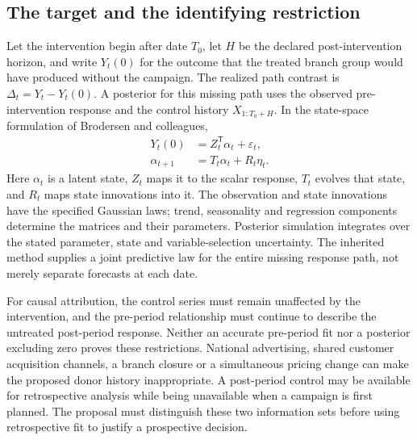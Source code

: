 \subsection{The target and the identifying restriction}

Let the intervention begin after date \(T_0\), let \(H\) be the declared
post-intervention horizon, and write \(Y_t(0)\) for the outcome that the
treated branch group would have produced without the campaign. The realized
path contrast is \(\Delta_t=Y_t-Y_t(0)\). A posterior for this missing path
uses the observed pre-intervention response and the control history
\(X_{1:T_0+H}\). In the state-space formulation of Brodersen and colleagues,
\begin{align}
 Y_t(0)&=Z_t^{\mathsf T}\alpha_t+\varepsilon_t,\\
 \alpha_{t+1}&=T_t\alpha_t+R_t\eta_t.
\end{align}
Here \(\alpha_t\) is a latent state, \(Z_t\) maps it to the scalar response,
\(T_t\) evolves that state, and \(R_t\) maps state innovations into it.
The observation and state innovations have the specified Gaussian laws;
trend, seasonality and regression components determine the matrices and
their parameters. Posterior simulation integrates over the stated parameter,
state and variable-selection uncertainty. The inherited method supplies a
joint predictive law for the entire missing response path, not merely
separate forecasts at each date. \citep{exec13_ci_brodersen2015}

For causal attribution, the control series must remain unaffected by the
intervention, and the pre-period relationship must continue to describe the
untreated post-period response. Neither an accurate pre-period fit nor a
posterior excluding zero proves these restrictions. National advertising,
shared customer acquisition channels, a branch closure or a simultaneous
pricing change can make the proposed donor history inappropriate. A
post-period control may be available for retrospective analysis while being
unavailable when a campaign is first planned. The proposal must distinguish
these two information sets before using retrospective fit to justify a
prospective decision. \citep{exec13_ci_r,exec13_ci_brodersen2015}

